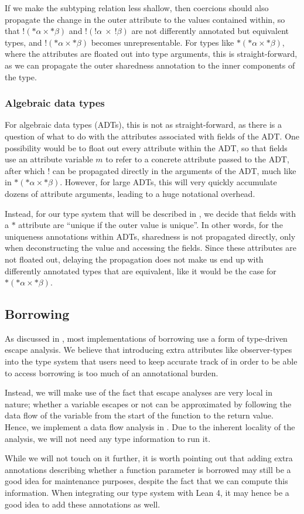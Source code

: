 If we make the subtyping relation less shallow, then coercions should also propagate the change in the outer attribute to the values contained within, so that $!(*\alpha \times *\beta)$ and $!(!\alpha\ \times\ !\beta)$ are not differently annotated but equivalent types, and $!(*\alpha \times *\beta)$ becomes unrepresentable. For types like $*(*\alpha \times *\beta)$, where the attributes are floated out into type arguments, this is straight-forward, as we can propagate the outer sharedness annotation to the inner components of the type.

\subsubsection{Algebraic data types}
For algebraic data types (ADTs), this is not as straight-forward, as there is a question of what to do with the attributes associated with fields of the ADT. One possibility would be to float out every attribute within the ADT, so that fields use an attribute variable $m$ to refer to a concrete attribute passed to the ADT, after which $!$ can be propagated directly in the arguments of the ADT, much like in $*(*\alpha \times *\beta)$. However, for large ADTs, this will very quickly accumulate dozens of attribute arguments, leading to a huge notational overhead.

Instead, for our type system that will be described in , we decide that fields with a $*$ attribute are ``unique if the outer value is unique''. In other words, for the uniqueness annotations within ADTs, sharedness is not propagated directly, only when deconstructing the value and accessing the fields. Since these attributes are not floated out, delaying the propagation does not make us end up with differently annotated types that are equivalent, like it would be the case for $*(*\alpha \times *\beta)$.

\subsection{Borrowing}
As discussed in , most implementations of borrowing use a form of type-driven escape analysis. We believe that introducing extra attributes like observer-types into the type system that users need to keep accurate track of in order to be able to access borrowing is too much of an annotational burden.

Instead, we will make use of the fact that escape analyses are very local in nature; whether a variable escapes or not can be approximated by following the data flow of the variable from the start of the function to the return value. Hence, we implement a data flow analysis \citep{allen_program_1976} in . Due to the inherent locality of the analysis, we will not need any type information to run it.

While we will not touch on it further, it is worth pointing out that adding extra annotations describing whether a function parameter is borrowed may still be a good idea for maintenance purposes, despite the fact that we can compute this information. When integrating our type system with Lean 4, it may hence be a good idea to add these annotations as well.